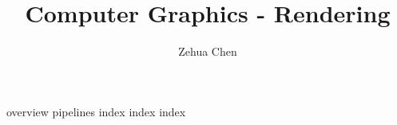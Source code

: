 \documentclass[letterpaper, 11pt]{report}
\title{Computer Graphics - Rendering}
\author{Zehua Chen}
\begin{document}
  \maketitle
  \tableofcontents

  {overview}
  {pipelines}
  {index}
  {index}
  {index}
\end{document}
